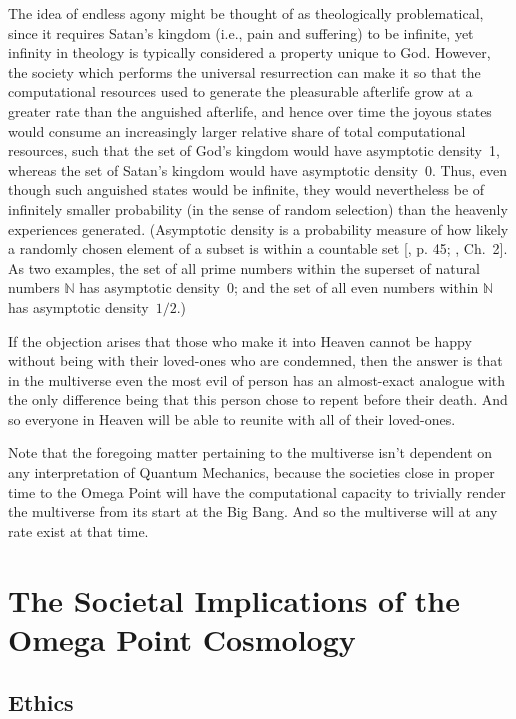 \documentclass[letterpaper,12pt]{article}
\begin{document}
{    The\label{AsymptoticDensityAndPunishment} idea of endless agony might be thought of as theologically problematical, since it requires Satan's kingdom (i.e., pain and suffering) to be infinite, yet infinity in theology is typically considered a property unique to God. However, the society which performs the universal resurrection can make it so that the computational resources used to generate the pleasurable afterlife grow at a greater rate than the anguished afterlife, and hence over time the joyous states would consume an increasingly larger relative share of total computational resources, such that the set of God's kingdom would have asymptotic density~1, whereas the set of Satan's kingdom would have asymptotic density~0. Thus, even though such anguished states would be infinite, they would nevertheless be of infinitely smaller probability (in the sense of random selection) than the heavenly experiences generated. (Asymptotic density is a probability measure of how likely a randomly chosen element of a subset is within a countable set [, p. 45; , Ch.~2]. As two examples, the set of all prime numbers within the superset of natural numbers \( \mathbb{N} \) has asymptotic density~0; and the set of all even numbers within \( \mathbb{N} \) has asymptotic density~\( 1 / 2 \).)\par
    If the objection arises that those who make it into Heaven cannot be happy without being with their loved-ones who are condemned, then the answer is that in the multiverse even the most evil of person has an almost-exact analogue with the only difference being that this person chose to repent before their death. And so everyone in Heaven will be able to reunite with all of their loved-ones.\par
    Note that the foregoing matter pertaining to the multiverse isn't dependent on any interpretation of Quantum Mechanics, because the societies close in proper time to the Omega Point will have the computational capacity to trivially render the multiverse from its start at the Big Bang. And so the multiverse will at any rate exist at that time.}

\section{The Societal Implications of the Omega Point Cosmology}
\label{sec:SocietalImplicationsOmegaPoint}

\subsection{Ethics}
\label{subsec:Ethics}
\end{document}
